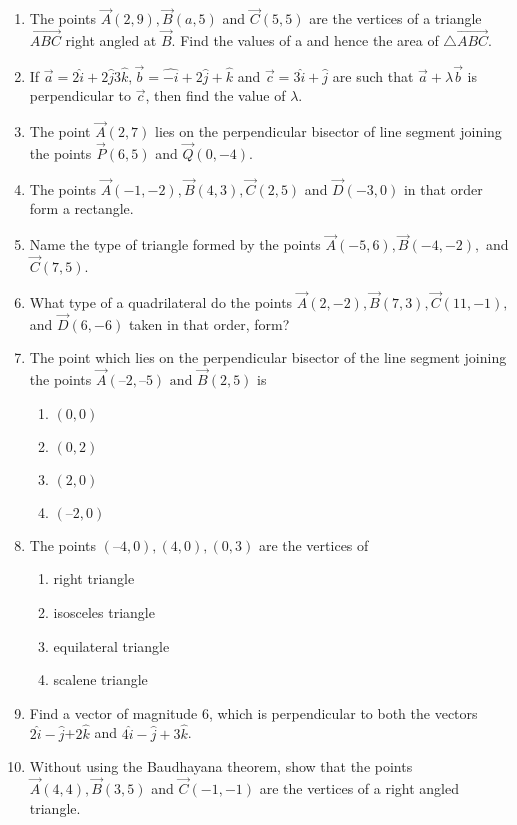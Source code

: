 \begin{enumerate}[label=\thesubsection.\arabic*, ref=\thesubsection.\theenumi]
\item The points $\vec{A}(2, 9), \vec{B}(a, 5) $ and $\vec{C}(5, 5)$ are the vertices of a triangle $\vec{ABC}$ right angled at $\vec{B}$. Find the values of a and hence the area of $\triangle \vec{ABC}$.
\item If $\overrightarrow {a}=2\hat{i}+2\hat{j}3\hat{k}, \overrightarrow {b}=\hat{-i}+2\hat{j}+\hat{k}$ and $\overrightarrow {c}=3\hat{i}+\hat{j}$ are such that $\overrightarrow {a}+\lambda\overrightarrow {b}$ is perpendicular to $\overrightarrow {c}$, then find the value of $\lambda$.
	\\
		
\item The point $\vec{A}(2, 7)$ lies on the perpendicular bisector of line segment joining the points $\vec{P}(6, 5)$ and $ \vec{Q}(0, -4)$.
\item The points $\vec{A}(-1, -2),  \vec{B}(4, 3),  \vec{C}(2, 5) $ and $ \vec{D}(-3, 0)$ in that order form a rectangle.
\item Name the type of triangle formed by the points $\vec{A}(-5, 6), \vec{B}(-4, -2), $ and $\vec{C}(7, 5)$.
\item What type of a quadrilateral do the points $\vec{A}(2, -2), \vec{B}(7, 3), \vec{C}(11, -1), $ and $\vec{D}(6, -6)$ taken in that order,  form?
\item The point which lies on the perpendicular bisector of the line segment joining the
	points $\vec{A} (–2,  –5)\text { and } \vec{B} (2,  5) $ is
\begin{enumerate}
\item  	$(0,  0)$
\item  $(0,  2)$ 
\item  $(2,  0)$ 
\item  $(–2,  0)$
\end{enumerate}
\item The points $ (–4,  0),  (4,  0),  (0,  3) $ are the vertices of
	\begin{enumerate}
\item right triangle 
\item isosceles triangle
\item  equilateral triangle
\item  scalene triangle 
\end{enumerate}
\item Find a vector of magnitude 6,  which is perpendicular to both the vectors $2\hat{i}-\hat{j}$+$2\hat{k}$ and $4\hat{i}-\hat{j}+3\hat{k}$.
\item Without using the Baudhayana theorem,  show that the points $\vec{A}(4, 4),  \vec{B}(3, 5)$ and $\vec{C}(-1, -1)$ are the vertices of a right angled triangle.

\end{enumerate}
